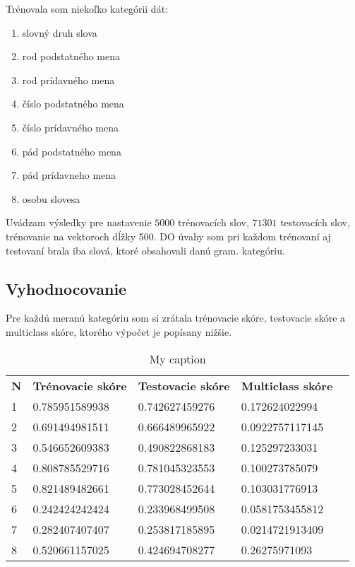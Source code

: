 \documentclass[12pt]{article}
\begin{document}
Trénovala som niekoľko kategórii dát:
\begin{enumerate}
\item slovný druh slova
\item rod podstatného mena
\item rod prídavného mena
\item číslo podstatného mena
\item číslo prídavného mena
\item pád podstatného mena
\item pád prídavneho mena
\item osobu slovesa\
\end{enumerate}
Uvádzam výsledky pre nastavenie $5000$ trénovacích slov, $71301$ testovacích slov, trénovanie na vektoroch dĺžky 500. DO úvahy som pri každom trénovaní aj testovaní brala iba slová, ktoré obsahovali danú gram. kategóriu.

\subsection{Vyhodnocovanie}

Pre každú meranú kategóriu som si zrátala trénovacie skóre, testovacie skóre a multiclass skóre, ktorého výpočet je popísany nižšie. 


\begin{table}[]
\centering
\caption{My caption}
\label{my-label}
\begin{tabular}{lllll}
\textbf{N} & \textbf{Trénovacie skóre} & \textbf{Testovacie skóre} & \textbf{Multiclass skóre} & \textbf{} \\
1          & 0.785951589938            & 0.742627459276            & 0.172624022994            &           \\
2          & 0.691494981511            & 0.666489965922            & 0.0922757117145           &           \\
3          & 0.546652609383            & 0.490822868183            & 0.125297233031            &         \\
4          & 0.808785529716            & 0.781045323553            & 0.100273785079            &           \\
5          & 0.821489482661            & 0.773028452644            & 0.103031776913          &           \\
6          & 0.242424242424            & 0.233968499508            & 0.0581753455812            &         \\ 
7          & 0.282407407407            & 0.253817185895            & 0.0214721913409          &           \\
8          & 0.520661157025            & 0.424694708277            & 0.26275971093            &         \\ 
\end{tabular}
\end{table}
\end{document}
